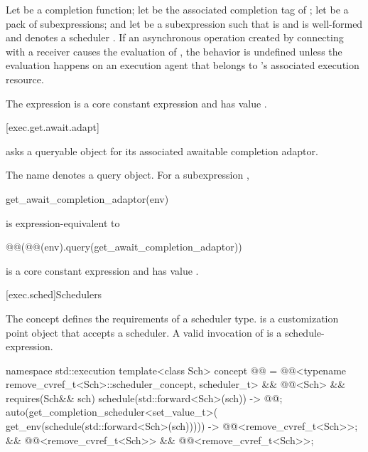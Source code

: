 \pnum
Let  be a completion function;
let  be
the associated completion tag of ;
let  be a pack of subexpressions; and
let  be a subexpression
such that  is  and
is well-formed and denotes a scheduler .
If an asynchronous operation
created by connecting  with a receiver 
causes the evaluation of ,
the behavior is undefined
unless the evaluation happens on an execution agent
that belongs to 's associated execution resource.

\pnum
The expression
is a core constant expression and has value .

[exec.get.await.adapt]{}

\pnum
{} asks a queryable object for
its associated awaitable completion adaptor.

\pnum
The name  denotes a query object.
For a subexpression ,
\begin{codeblock}
get_await_completion_adaptor(env)
\end{codeblock}
is expression-equivalent to
\begin{codeblock}
@@(@@(env).query(get_await_completion_adaptor))
\end{codeblock}

\pnum
{}
is a core constant expression and has value .

[exec.sched]{Schedulers}

\pnum
The  concept defines
the requirements of a scheduler type.
 is a customization point object
that accepts a scheduler.
A valid invocation of  is a schedule-expression.
\begin{codeblock}
namespace std::execution {
  template<class Sch>
    concept @@ =
      @@<typename remove_cvref_t<Sch>::scheduler_concept, scheduler_t> &&
      @@<Sch> &&
      requires(Sch&& sch) {
        { schedule(std::forward<Sch>(sch)) } -> @@;
        { auto(get_completion_scheduler<set_value_t>(
            get_env(schedule(std::forward<Sch>(sch))))) }
              -> @@<remove_cvref_t<Sch>>;
      } &&
      @@<remove_cvref_t<Sch>> &&
      @@<remove_cvref_t<Sch>>;
}
\end{codeblock}

